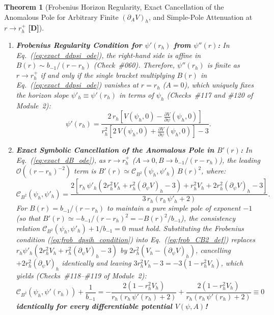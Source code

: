 \documentclass[11pt,a4paper]{article}
\newcommand{\catD}{\textbf{\textcolor{blue!75!black}{[D]}}}
\newtheorem{theorem}{Theorem}[section]
\theoremstyle{definition}
\theoremstyle{remark}
\begin{document}
\begin{theorem}[Frobenius Horizon Regularity, Exact Cancellation of the Anomalous Pole for Arbitrary Finite $(\partial_A V)_h$, and Simple-Pole Attenuation at $r \to r_h^+$ \catD]
\begin{enumerate}
  \item[\textnormal{(ii)}] \textbf{Frobenius Regularity Condition for $\psi'(r_h)$ from $\psi''(r)$:} In Eq.~(\ref{eq:exact_ddpsi_ode}), the right-hand side is affine in $B(r) \sim b_{-1}/(r - r_h)$ (Check~\#060). Therefore, $\psi''(r_h)$ is finite as $r \to r_h^+$ if and only if the single bracket multiplying $B(r)$ in Eq.~(\ref{eq:exact_ddpsi_ode}) vanishes at $r = r_h$ ($A = 0$), which uniquely fixes the horizon slope $\psi'_h \equiv \psi'(r_h)$ in terms of $\psi_h$ (Checks~\#117 and \#120 of Module~2):
  \begin{equation}
    \psi'(r_h) = \frac{2\,r_h\left[V(\psi_h, 0) - \frac{\partial V}{\partial\psi}(\psi_h, 0)\right]}{r_h^2\left[2\,V(\psi_h, 0) + \frac{\partial V}{\partial\psi}(\psi_h, 0)\right] - 3}.
    \label{eq:frob_dpsih_condition}
  \end{equation}
  \item[\textnormal{(iii)}] \textbf{Exact Symbolic Cancellation of the Anomalous Pole in $B'(r)$:} In Eq.~(\ref{eq:exact_dB_ode}), as $r \to r_h^+$ ($A \to 0, B \to b_{-1}/(r - r_h)$), the leading $\mathcal{O}((r - r_h)^{-2})$ term is $B'(r) \simeq \mathcal{C}_{B^2}(\psi_h, \psi'_h)\,B(r)^2$, where:
  \begin{equation}
    \mathcal{C}_{B^2}(\psi_h, \psi'_h) = \frac{2\left[r_h\,\psi'_h\left(2 r_h^2 V_h + r_h^2(\partial_{\psi}V)_h - 3\right) + r_h^2 V_h + 2 r_h^2(\partial_{\psi}V)_h - 3\right]}{3\,r_h\left(r_h\,\psi'_h + 2\right)}.
    \label{eq:frob_CB2_def}
  \end{equation}
  For $B(r) = b_{-1}/(r - r_h)$ to maintain a pure simple pole of exponent $-1$ (so that $B'(r) \simeq -b_{-1}/(r - r_h)^2 = -B(r)^2/b_{-1}$), the consistency relation $\mathcal{C}_{B^2}(\psi_h, \psi'_h) + 1/b_{-1} = 0$ must hold. Substituting the Frobenius condition (\ref{eq:frob_dpsih_condition}) into Eq.~(\ref{eq:frob_CB2_def}) replaces $r_h\psi'_h(2r_h^2 V_h + r_h^2(\partial_{\psi}V)_h - 3)$ by $2r_h^2(V_h - (\partial_{\psi}V)_h)$, cancelling $+2r_h^2(\partial_{\psi}V)_h$ identically and leaving $3r_h^2 V_h - 3 = -3(1 - r_h^2 V_h)$, which yields (Checks~\#118--\#119 of Module~2):
  \begin{equation}
    \mathcal{C}_{B^2}\!\left(\psi_h, \psi'(r_h)\right) + \frac{1}{b_{-1}} = -\frac{2\left(1 - r_h^2 V_h\right)}{r_h\left(r_h\,\psi'(r_h) + 2\right)} + \frac{2\left(1 - r_h^2 V_h\right)}{r_h\left(r_h\,\psi'(r_h) + 2\right)} \equiv 0
    \label{eq:frob_pole_cancel}
  \end{equation}
  \textbf{identically for every differentiable potential $V(\psi,A)$!}

\end{enumerate}
\end{theorem}
\end{document}
